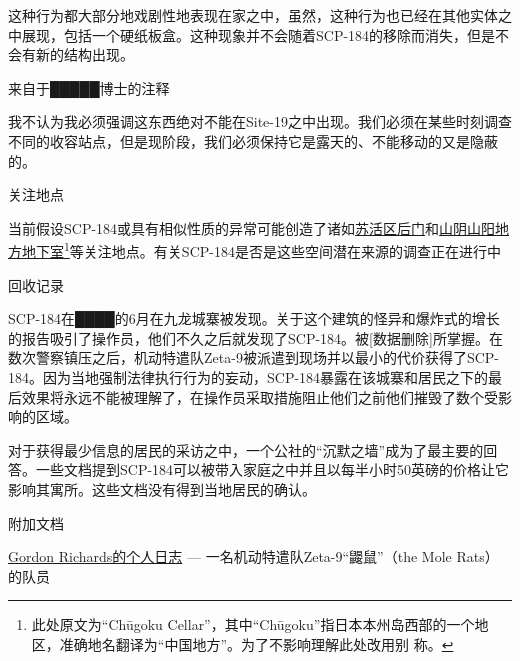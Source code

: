 这种行为都大部分地戏剧性地表现在家之中，虽然，这种行为也已经在其他实体之中展现，包括一个硬纸板盒。这种现象并不会随着SCP-184的移除而消失，但是不会有新的结构出现。

\hr

来自于█████博士的注释

我不认为我必须强调这东西绝对不能在Site-19之中出现。我们必须在某些时刻调查不同的收容站点，但是现阶段，我们必须保持它是露天的、不能移动的又是隐蔽的。

关注地点

当前假设SCP-184或具有相似性质的异常可能创造了诸如\hyperref[chap:TAIL-alternate-character-interpretations]{苏活区后门}和\hyperref[chap:TAIL-making-a-scene]{山阴山阳地方地下室}\footnote{此处原文为“Chūgoku Cellar”，其中“Chūgoku”指日本本州岛西部的一个地区，准确地名翻译为“中国地方”。为了不影响理解此处改用别
称。}等关注地点。有关SCP-184是否是这些空间潜在来源的调查正在进行中

回收记录

SCP-184在████的6月在九龙城寨被发现。关于这个建筑的怪异和爆炸式的增长的报告吸引了操作员，他们不久之后就发现了SCP-184。被{[}数据删除]所掌握。在数次警察镇压之后，机动特遣队Zeta-9被派遣到现场并以最小的代价获得了SCP-184。因为当地强制法律执行行为的妄动，SCP-184暴露在该城寨和居民之下的最后效果将永远不能被理解了，在操作员采取措施阻止他们之前他们摧毁了数个受影响的区域。

对于获得最少信息的居民的采访之中，一个公社的“沉默之墙”成为了最主要的回答。一些文档提到SCP-184可以被带入家庭之中并且以每半小时50英磅的价格让它影响其寓所。这些文档没有得到当地居民的确认。

附加文档

\hyperref[sec:DOC-personal-log-of-gordon-richards]{Gordon Richards的个人日志} — 一名机动特遣队Zeta-9“鼹鼠”（the Mole Rats）的队员

\newpage


